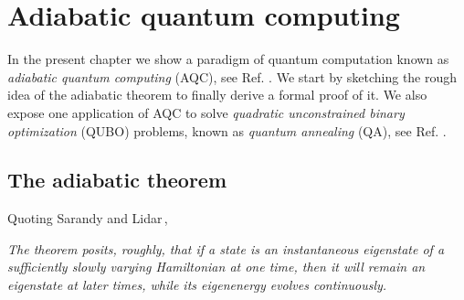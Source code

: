 
\chapter{Adiabatic quantum computing} %

\label{Chapter2} %
In the present chapter we show a paradigm of quantum computation known as \textit{adiabatic quantum computing} (AQC), see Ref. \cite{Farhi2000QuantumEvolution}. We start by sketching the rough idea of the adiabatic theorem to finally derive a formal proof of it. We also expose one application of AQC to solve \textit{quadratic unconstrained binary optimization} (QUBO) problems, known as \textit{quantum annealing} (QA), see Ref. \cite{Kadowaki1998QuantumModel}.

\section{The adiabatic theorem}
Quoting Sarandy and Lidar\,\cite{Sarandy2005AdiabaticSystems},
\begin{displayquote}
\textit{The theorem posits, roughly, that if a state is an instantaneous eigenstate of a sufficiently slowly varying Hamiltonian at one time, then it will remain an eigenstate at later times, while its eigenenergy evolves continuously.}
\end{displayquote}
